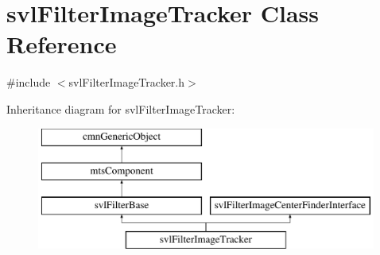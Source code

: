 \hypertarget{classsvl_filter_image_tracker}{\section{svl\-Filter\-Image\-Tracker Class Reference}
\label{classsvl_filter_image_tracker}
}


{\ttfamily \#include $<$svl\-Filter\-Image\-Tracker.\-h$>$}

Inheritance diagram for svl\-Filter\-Image\-Tracker\-:\begin{figure}[H]
\begin{center}
\leavevmode
\includegraphics[height=4.000000cm]{d9/df0/classsvl_filter_image_tracker}
\end{center}
\end{figure}
